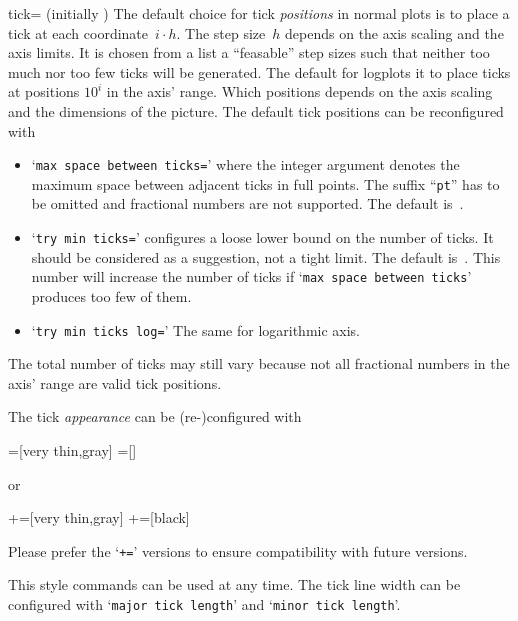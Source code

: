 \begin{pgfplotsxykey}{\x tick= (initially \marg{})}
\noindent
The default choice for tick \emph{positions} in normal plots is to place a tick at each coordinate~$i\cdot h$. The step size~$h$ depends on the axis scaling and the axis limits. It is chosen from a list a ``feasable'' step sizes such that neither too much nor too few ticks will be generated. The default for logplots it to place ticks at positions $10^i$ in the axis' range. Which positions depends on the axis scaling and the dimensions of the picture. The default tick positions can be reconfigured with
\begin{itemize}
	\item `\lstinline!max space between ticks=!' where the integer argument denotes the maximum space between adjacent ticks in full points. The suffix ``\texttt{pt}'' has to be omitted and fractional numbers are not supported. The default is~\axisdefaulttickwidth.
	\item `\lstinline!try min ticks=!' configures a loose lower bound on the number of ticks. It should be considered as a suggestion, not a tight limit. The default is~\axisdefaulttryminticks. This number will increase the number of ticks if `\texttt{max space between ticks}' produces too few of them.
	\item `\lstinline!try min ticks log=!' The same for logarithmic axis.
\end{itemize}
The total number of ticks may still vary because not all fractional numbers in the axis' range are valid tick positions.


\noindent
The tick \emph{appearance} can be (re-)configured with
\begin{codeexample}
=[very thin,gray]
=[]
\end{codeexample}
or
\begin{codeexample}
+=[very thin,gray]
+=[black]
\end{codeexample}
Please prefer the `\texttt{+=}' versions to ensure compatibility with future versions.

This style commands can be used at any time. The tick line width can be configured with `\texttt{major tick length}' and `\texttt{minor tick length}'.
\end{pgfplotsxykey}

